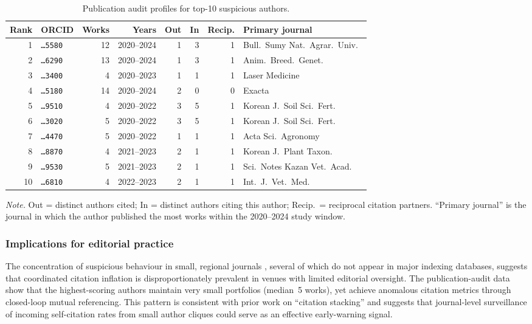 \begin{table}[t]
\centering
\caption{Publication audit profiles for top-10 suspicious authors.}
\label{tab:author-audit}
\small
\begin{tabular}{rl rrr rrl}
\toprule
Rank & ORCID & Works & Years & Out & In & Recip. & Primary journal \\
\midrule
  1 & \texttt{\dots5580} & 12 & 2020--2024 & 1 & 3 & 1 & Bull.\ Sumy Nat.\ Agrar.\ Univ.\ \\
  2 & \texttt{\dots6290} & 13 & 2020--2024 & 1 & 3 & 1 & Anim.\ Breed.\ Genet.\ \\
  3 & \texttt{\dots3400} &  4 & 2020--2023 & 1 & 1 & 1 & Laser Medicine \\
  4 & \texttt{\dots5180} & 14 & 2020--2024 & 2 & 0 & 0 & Exacta \\
  5 & \texttt{\dots9510} &  4 & 2020--2022 & 3 & 5 & 1 & Korean J.\ Soil Sci.\ Fert.\ \\
  6 & \texttt{\dots3020} &  5 & 2020--2022 & 3 & 5 & 1 & Korean J.\ Soil Sci.\ Fert.\ \\
  7 & \texttt{\dots4470} &  5 & 2020--2022 & 1 & 1 & 1 & Acta Sci.\ Agronomy \\
  8 & \texttt{\dots8870} &  4 & 2021--2023 & 2 & 1 & 1 & Korean J.\ Plant Taxon.\ \\
  9 & \texttt{\dots9530} &  5 & 2021--2023 & 2 & 1 & 1 & Sci.\ Notes Kazan Vet.\ Acad.\ \\
 10 & \texttt{\dots6810} &  4 & 2022--2023 & 2 & 1 & 1 & Int.\ J.\ Vet.\ Med.\ \\
\bottomrule
\end{tabular}

\medskip
{\footnotesize\textit{Note.}
  Out = distinct authors cited;
  In = distinct authors citing this author;
  Recip.\ = reciprocal citation partners.
  ``Primary journal'' is the journal in which the author published
  the most works within the 2020--2024 study window.}
\end{table}

\subsubsection*{Implications for editorial practice}

The concentration of suspicious behaviour in small, regional journals
, several of which do not appear in major indexing databases,
suggests that coordinated citation inflation is disproportionately
prevalent in venues with limited editorial oversight.
The publication-audit data show that the highest-scoring authors
maintain very small portfolios (median~5 works), yet achieve
anomalous citation metrics through closed-loop mutual referencing.
This pattern is consistent with prior work on ``citation stacking''
\citep{heneberg2016} and suggests that journal-level surveillance
of incoming self-citation rates from small author cliques could serve
as an effective early-warning signal.
